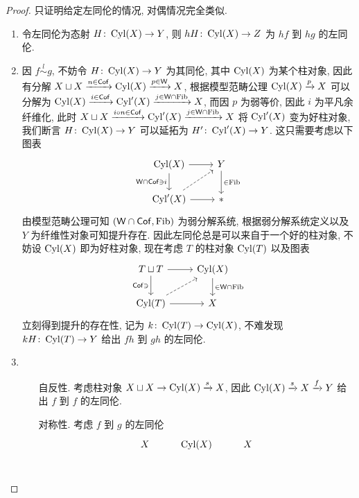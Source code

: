 \begin{proof}
只证明给定左同伦的情况, 对偶情况完全类似.
    \begin{enumerate}
        \item 令左同伦为态射 $H \colon \operatorname{Cyl}(X) \to Y$, 则 $hH \colon \operatorname{Cyl}(X) \to Z$ 为 $hf$ 到 $hg$ 的左同伦.
        \item 因 $f\overset{l}{\sim} g$, 不妨令 $H \colon \operatorname{Cyl}(X) \to Y$ 为其同伦, 其中 $\operatorname{Cyl}(X)$ 为某个柱对象, 因此有分解 $X\sqcup X\xrightarrow{n\in \mathsf{Cof}} \operatorname{Cyl}(X) \xrightarrow{p\in\mathsf{W}} X$, 根据模型范畴公理 $\operatorname{Cyl}(X) \xrightarrow{p} X$ 可以分解为 $\operatorname{Cyl}(X) \xrightarrow{i \in \mathsf{Cof}} \operatorname{Cyl}'(X) \xrightarrow{j\in \mathsf{W}\cap \operatorname{Fib}} X$, 而因 $p$ 为弱等价, 因此 $i$ 为平凡余纤维化, 此时 $X\sqcup X \xrightarrow{i\circ n\in \mathsf{Cof}} \operatorname{Cyl}'(X) \xrightarrow{j\in \mathsf{W}\cap \operatorname{Fib}} X$ 将 $\operatorname{Cyl}'(X)$ 变为好柱对象, 我们断言 $H \colon \operatorname{Cyl}(X) \to Y$ 可以延拓为 $H' \colon \operatorname{Cyl}'(X) \to Y$. 这只需要考虑以下图表
        \[\begin{tikzcd}
	{\Cyl(X)} & Y \\
	{\Cyl'(X)} & {*}
	\arrow[from=1-1, to=1-2]
	\arrow["{\cate{W}\cap \Cof\ni i}"', from=1-1, to=2-1]
	\arrow["{\in \Fib}", from=1-2, to=2-2]
	\arrow[dashed, from=2-1, to=1-2]
	\arrow[from=2-1, to=2-2]
        \end{tikzcd}\]
        由模型范畴公理可知 $(\mathsf{W}\cap \mathsf{Cof},\operatorname{Fib})$ 为弱分解系统, 根据弱分解系统定义以及 $Y$ 为纤维性对象可知提升存在. 因此左同伦总是可以来自于一个好的柱对象, 不妨设 $\operatorname{Cyl}(X)$ 即为好柱对象, 现在考虑 $T$ 的柱对象 $\operatorname{Cyl}(T)$ 以及图表
        \[\begin{tikzcd}
	{T\sqcup T} & {\Cyl(X)} \\
	{\Cyl(T)} & X
	\arrow[from=1-1, to=1-2]
	\arrow["{\Cof \ni}"', from=1-1, to=2-1]
	\arrow["{\in \cate{W}\cap \Fib}", from=1-2, to=2-2]
	\arrow[dashed, from=2-1, to=1-2]
	\arrow[from=2-1, to=2-2]
        \end{tikzcd}\]
        立刻得到提升的存在性, 记为 $k \colon \operatorname{Cyl}(T) \to \operatorname{Cyl}(X)$, 不难发现 $k H \colon \operatorname{Cyl}(T) \to Y$ 给出 $fh$ 到 $gh$ 的左同伦.
        \item \begin{enumerate}
            \item[自反性.] 考虑柱对象 $X\sqcup X \to \operatorname{Cyl}(X) \xrightarrow{s} X$, 因此 $\operatorname{Cyl}(X) \xrightarrow{s} X \xrightarrow{f} Y$ 给出 $f$ 到 $f$ 的左同伦.
            \item[对称性.] 考虑 $f$ 到 $g$ 的左同伦
            \[\begin{tikzcd}
	X & {\Cyl(X)} & X \\

\end{tikzcd}\]
\end{enumerate}
\end{enumerate}
\end{proof}
